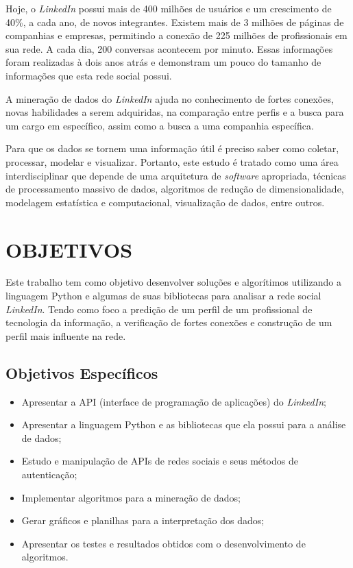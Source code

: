 Hoje, o \textit{LinkedIn} possui mais de 400 milhões de usuários e um crescimento de 40\%, a cada ano, de novos integrantes. Existem mais de 3 milhões de páginas de companhias e empresas, permitindo a conexão de 225 milhões de profissionais em sua rede. A cada dia, 200 conversas acontecem por minuto. Essas informações foram realizadas à dois anos atrás e demonstram um pouco do tamanho de informações que esta rede social possui. \cite{linkedin-about}

A mineração de dados do \textit{LinkedIn} ajuda no conhecimento de fortes conexões, novas habilidades a serem adquiridas, na comparação entre perfis e a busca para um cargo em específico, assim como a busca a uma companhia específica.

Para que os dados se tornem uma informação útil é preciso saber como coletar, processar, modelar e visualizar. Portanto, este estudo é tratado como uma área interdisciplinar que depende de uma arquitetura de \textit{software} apropriada, técnicas de processamento massivo de dados, algoritmos de redução de dimensionalidade, modelagem estatística e computacional, visualização de dados, entre outros.


\section{OBJETIVOS}\label{sec:objetivos}

Este trabalho tem como objetivo desenvolver soluções e algorítimos utilizando a linguagem Python e algumas de suas bibliotecas para analisar a rede social \textit{LinkedIn}. Tendo como foco a predição de um perfil de um profissional de tecnologia da informação, a verificação de fortes conexões e construção de um perfil mais influente na rede.

\subsection{Objetivos Específicos}\label{subsec:objetivos_especificos}

\begin{itemize}
    \item Apresentar a API (interface de programação de aplicações) do \textit{LinkedIn};
    \item Apresentar a linguagem Python e as bibliotecas que ela possui para a análise de dados;
    \item Estudo e manipulação de APIs de redes sociais e seus métodos de autenticação;
    \item Implementar algoritmos para a mineração de dados;
    \item Gerar gráficos e planilhas para a interpretação dos dados;
    \item Apresentar os testes e resultados obtidos com o desenvolvimento de algoritmos.
\end{itemize}

